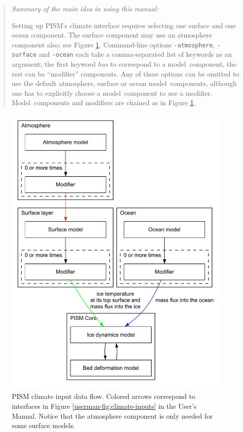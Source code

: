 \documentclass[titlepage,letterpaper,final]{scrartcl}
\begin{document}
\vspace{0.3in}

\begin{quote}
\begin{center}
\emph{Summary of the main idea in using this manual:}
\end{center}

Setting up PISM's climate interface requires selecting one surface and one
ocean component. The surface component may use an atmosphere component also;
see Figure \ref{fig:climate-input-data-flow-repeated}. Command-line options
\texttt{-atmosphere}, \texttt{-surface} and \texttt{-ocean} each take a
comma-separated list of keywords as an argument; the first keyword \emph{has}
to correspond to a model~component, the rest can be ``modifier'' components.
Any of these options can be omitted to use the default atmosphere, surface or
ocean model~components, although one has to explicitly choose a model~component
to use a modifier. Model~components and modifiers are chained as in Figure
\ref{fig:climate-input-data-flow-repeated}.
\end{quote}

\begin{figure}
  \centering
  \includegraphics[width=5in]{../userman/figs/data-flow.pdf}
  \caption{PISM climate input data flow.  Colored arrows correspond to interfaces in
    Figure \ref*{userman-fig:climate-inputs} in the User's Manual.  Notice that the atmosphere component is only needed for some surface models.}
  \label{fig:climate-input-data-flow-repeated}
\end{figure}
\end{document}
